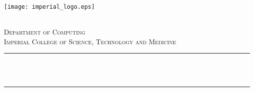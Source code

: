 \begin{title}

\newcommand{\HRule}{\rule{\linewidth}{0.5mm}} %


\texttt{[image: imperial\_logo.eps]}\\[0.5cm] 

\center %
 

\textsc{\LARGE \reporttype}\\[1.5cm] 
\textsc{\Large Department of Computing}\\[0.5cm] 
\textsc{\large Imperial College of Science, Technology and Medicine}\\[0.5cm] 


\HRule \\[0.4cm]
{ \huge \bfseries \reporttitle}\\ %
\HRule \\[1.5cm]
 


\end{title}
